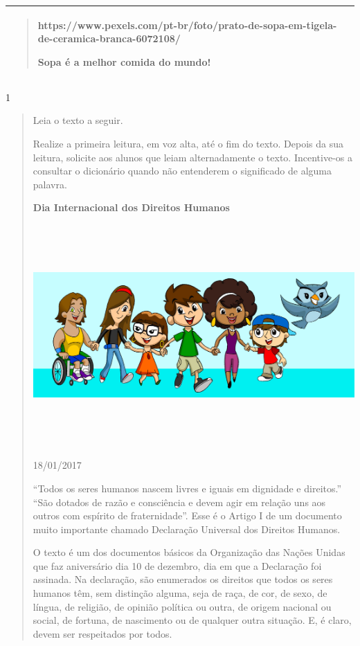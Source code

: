 \begin{itemize}
{{{\begin{itemize}
\begin{itemize}
\begin{itemize}
\begin{longtable}[]{@{}l@{}}
\begin{minipage}[t]{0.97\columnwidth}
\begin{quote}
https://www.pexels.com/pt-br/foto/prato-de-sopa-em-tigela-de-ceramica-branca-6072108/

Sopa é a melhor comida do mundo!
\end{quote}\strut
\end{minipage}\tabularnewline
\bottomrule
\end{longtable}


\num{1}

\begin{quote}
Leia o texto a seguir.

Realize a primeira leitura, em voz alta, até o fim do texto. Depois da
sua leitura, solicite aos alunos que leiam alternadamente o texto.
Incentive-os a consultar o dicionário quando não entenderem o
significado de alguma palavra.

\textbf{Dia Internacional dos Direitos Humanos}

\includegraphics[width=5.90556in,height=3.33125in]{media/image28.jpeg}

18/01/2017~

``Todos os seres humanos nascem livres e iguais em dignidade e
direitos.'' ``São dotados de razão e consciência e devem agir em relação
uns aos outros com espírito de fraternidade''. Esse é o Artigo I de um
documento muito importante chamado Declaração Universal dos Direitos
Humanos.

O texto é um dos documentos básicos da Organização das Nações Unidas que
faz aniversário dia 10 de dezembro, dia em que a Declaração foi
assinada. Na declaração, são enumerados os direitos que todos os seres
humanos têm, sem distinção alguma, seja de raça, de cor, de sexo, de
língua, de religião, de opinião política ou outra, de origem nacional ou
social, de fortuna, de nascimento ou de qualquer outra situação. E, é
claro, devem ser respeitados por todos.


\end{quote}
\end{itemize}
\end{itemize}
\end{itemize}}}}
\end{itemize}

